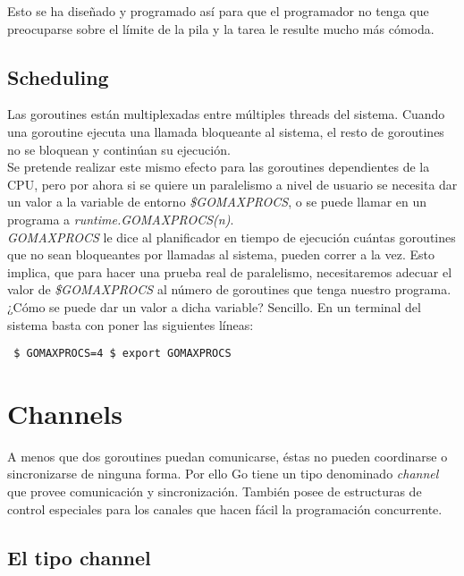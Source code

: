 	Esto se ha diseñado y programado así para que el programador no tenga que
	preocuparse sobre el límite de la pila y la tarea le resulte mucho más
	cómoda.
	
	\subsection{Scheduling}
	
	Las goroutines están multiplexadas entre múltiples threads del sistema.
	Cuando una goroutine ejecuta una llamada bloqueante al sistema, el resto de
	goroutines no se bloquean y continúan su ejecución.\\
	
	Se pretende realizar este mismo efecto para las goroutines dependientes de
	la CPU, pero por ahora si se quiere un paralelismo a nivel de usuario se
	necesita dar un valor a la variable de entorno \textit{\$GOMAXPROCS}, o se
	puede llamar en un programa a \textit{runtime.GOMAXPROCS(n)}.\\
	
	\textit{GOMAXPROCS} le dice al planificador en tiempo de ejecución cuántas
	goroutines que no sean bloqueantes por llamadas al sistema, pueden correr
	a la vez. Esto implica, que para hacer una prueba real de paralelismo,
	necesitaremos adecuar el valor de \textit{\$GOMAXPROCS} al número de
	goroutines que tenga nuestro programa.\\
	
	¿Cómo se puede dar un valor a dicha variable? Sencillo. En un terminal del
	sistema basta con poner las siguientes líneas:
	
	\begin{verbatim} $ GOMAXPROCS=4 $ export GOMAXPROCS \end{verbatim}

\section{Channels\label{channels}}

A menos que dos goroutines puedan comunicarse, éstas no pueden coordinarse
o sincronizarse de ninguna forma. Por ello Go tiene un tipo denominado
\textit{channel} que provee comunicación y sincronización. También posee de
estructuras de control especiales para los canales que hacen fácil la
programación concurrente.

	\subsection{El tipo channel}
	
